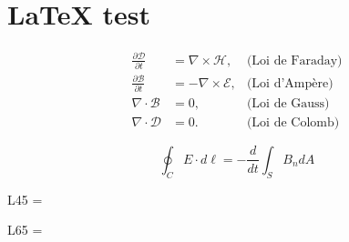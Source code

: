 \chapter{{\LaTeX} test}
\begin{equation}
    \label{eq:maxwell}
    \begin{aligned}
    \frac{\partial\mathcal{D}}{\partial t} & = \nabla\times\mathcal{H},   & \text{(Loi de Faraday)}\\
    \frac{\partial\mathcal{B}}{\partial t} & = -\nabla\times\mathcal{E},  & \text{(Loi d'Ampère)}\\
    \nabla\cdot\mathcal{B}                 & = 0,                         & \text{(Loi de Gauss)}\\
    \nabla\cdot\mathcal{D}                 & = 0.                         & \text{(Loi de Colomb)}
    \end{aligned}
\end{equation}

\[
    \oint_C {E \cdot d\ell = - \frac{d}{{dt}}} \int_S {B_n dA}
\]

L45 = \the\xlvchars\par
L65 = \the\lxvchars

\newpage
\layout
